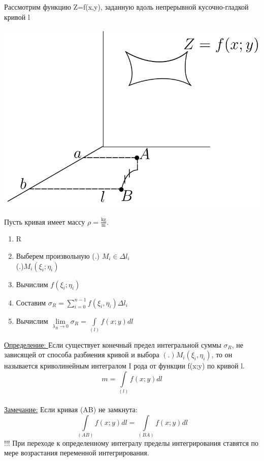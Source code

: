 \documentclass[12pt]{article}
\let\ORIincludegraphics\includegraphics
\renewcommand{\includegraphics}[2][]{\ORIincludegraphics[scale=0.65,#1]{#2}}
\let\oldint\int
\let\oldsum\sum
\let\oldlim\lim
\renewcommand{\int}{\oldint\limits}
\renewcommand{\sum}{\oldsum\limits}
\renewcommand{\lim}{\oldlim\limits}
\begin{document}
  \vspace{1em}
  \par Рассмотрим функцию Z=f(x,y), заданную вдоль непрерывной кусочно-гладкой кривой l\\

  \begin{minipage}{0.45\textwidth}
    \includegraphics[scale=0.6]{8.1.2.png}
  \end{minipage}
  \hspace{1em} %
  \begin{minipage}{0.65\textwidth} %
      Пусть кривая имеет массу $\rho=\frac{\mathrm{kg}}{\mathrm{m}}$.
      \begin{enumerate}
        \item R
        \item Выберем произвольную (.) $M_i \in \Delta l_i$\\ (.)$M_i (\xi_i;\eta_i)$
        \item Вычислим $f(\xi_i;\eta_i)$
        \item Составим $\sigma_R = \sum_{i=0}^{n-1} f(\xi_i,\eta_i) \Delta l_i$
        \item Вычислим $\lim_{\lambda_R \to 0} \sigma_R = \int_{(l)} f(x;y) dl$
      \end{enumerate}
  \end{minipage}
  \vspace{1em}
  \par
  \underline{Определение: } Если существует конечный предел интегральной суммы $\sigma_R$, не 
  зависящей от способа разбиения кривой и выбора $(.) M_i(\xi_i,\eta_i)$, то он называется
  криволинейным интегралом I рода от функции f(x;y) по кривой l.\\
  \[m=\int_{(l)} f(x;y) dl\]\\
  \underline{Замечание:} Если кривая (AB) не замкнута: \[\int_{(AB)} f(x;y)dl = \int_{(BA)} f(x;y)dl\]
  !!! При переходе к определенному интегралу пределы интегрирования ставятся по мере возрастания
  переменной интегрирования.
\end{document}
